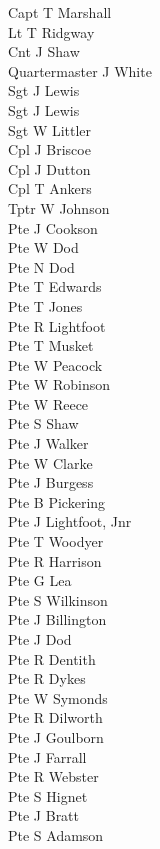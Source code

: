 \begin{multicols}{2}
  \noindent
  Capt T Marshall \\
  Lt T Ridgway \\
  Cnt J Shaw \\
  Quartermaster J White \\
  Sgt J Lewis \\
  Sgt J Lewis \\
  Sgt W Littler \\
  Cpl J Briscoe \\
  Cpl J Dutton \\
  Cpl T Ankers \\
  Tptr W Johnson \\
  Pte J Cookson \\
  Pte W Dod \\
  Pte N Dod \\
  Pte T Edwards \\
  Pte T Jones \\
  Pte R Lightfoot \\
  Pte T Musket \\
  Pte W Peacock \\
  Pte W Robinson \\
  Pte W Reece \\
  Pte S Shaw \\
  Pte J Walker \\
  Pte W Clarke \\
  Pte J Burgess \\
  Pte B Pickering \\
  Pte J Lightfoot, Jnr \\
  Pte T Woodyer \\
  Pte R Harrison \\
  Pte G Lea \\
  Pte S Wilkinson \\
  Pte J Billington \\
  Pte J Dod \\
  Pte R Dentith \\
  Pte R Dykes \\
  Pte W Symonds \\
  Pte R Dilworth \\
  Pte J Goulborn \\
  Pte J Farrall \\
  Pte R Webster \\
  Pte S Hignet \\
  Pte J Bratt \\
  Pte S Adamson \\

\end{multicols}
